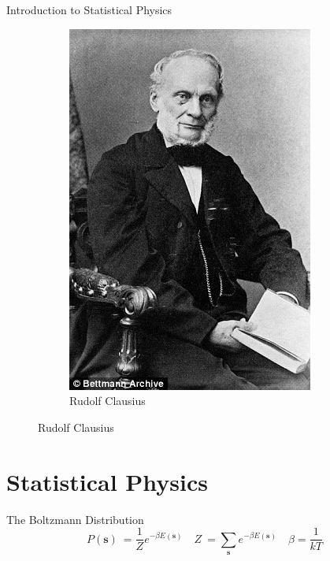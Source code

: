 \documentclass{beamer}
\newcommand{\bolds}[1]{\boldsymbol{#1}}
\newcommand{\bs}{\bolds{s}}
\renewcommand{\b}{\beta}
\begin{document}
\begin{frame}{Introduction to Statistical Physics}
\begin{figure}[h!]
\begin{subfigure}[b]{0.25\linewidth}
      \includegraphics[width=\linewidth]{figures/clausius.jpeg}
      \caption{Rudolf Clausius~\cite{clausius}}
    \end{subfigure}
    \label{fig:the-greats}
  \end{figure}
\end{frame}

\section{Statistical Physics}
\begin{frame}{The Boltzmann Distribution}
  \begin{equation*}%
    \boxed{P(\bs)\:=\frac{1}{Z}e^{-\b E(\bs)}\quad Z\:=\sum_{\bs} e^{-\b E(\bs)}\quad \b = \frac{1}{kT}}
  \end{equation*}%
\end{frame}
\end{document}
